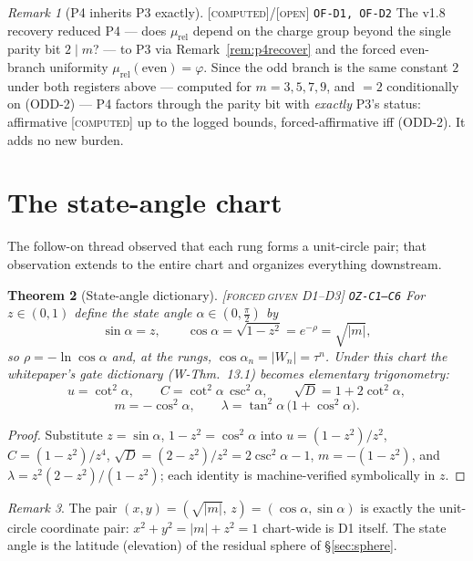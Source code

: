 \documentclass[11pt]{article}
\newcommand{\tagFD}{\textcolor{cF}{\textsc{[forced}}\,\textcolor{cD}{\textsc{given D1--D3]}}}
\newcommand{\tagC}{\textcolor{cC}{\textsc{[computed]}}}
\newcommand{\tagO}{\textcolor{cO}{\textsc{[open]}}}
\newcommand{\hx}[1]{\textcolor{cC}{\footnotesize\texttt{#1}}}
\newcommand{\gp}{\varphi}
\theoremstyle{plain}
\newtheorem{theorem}{Theorem}[section]
\theoremstyle{definition}
\theoremstyle{remark}
\newtheorem{remark}[theorem]{Remark}
\begin{document}
\begin{remark}[P4 inherits P3 exactly]\label{rem:p4transfer}\tagC{}/\tagO{} \hx{OF-D1, OF-D2}
The v1.8 recovery reduced P4 --- does $\mu_{\mathrm{rel}}$ depend on the charge
group beyond the single parity bit $2\mid m$? --- to P3 via
Remark~\ref{rem:p4recover} and the forced even-branch uniformity
$\mu_{\mathrm{rel}}(\text{even})=\gp$. Since the odd branch is the same constant
$2$ under both registers above --- computed for $m=3,5,7,9$, and $=2$
conditionally on (ODD-2) --- P4 factors through the parity bit with \emph{exactly}
P3's status: affirmative \tagC{} up to the logged bounds, forced-affirmative iff
(ODD-2). It adds no new burden.
\end{remark}

\section{The state-angle chart}\label{sec:stateangle}

The follow-on thread observed that each rung forms a unit-circle pair; that
observation extends to the entire chart and organizes everything downstream.

\begin{theorem}[State-angle dictionary]\label{thm:stateangle}\tagFD{} \hx{OZ-C1--C6}
For $z\in(0,1)$ define the \emph{state angle} $\alpha\in(0,\tfrac\pi2)$ by
\[
\sin\alpha=z,\qquad \cos\alpha=\sqrt{1-z^2}=e^{-\rho}=\sqrt{|m|},
\]
so $\rho=-\ln\cos\alpha$ and, at the rungs, $\cos\alpha_n=|W_n|=\tau^n$.
Under this chart the whitepaper's gate dictionary (W-Thm.\ 13.1) becomes
elementary trigonometry:
\[
u=\cot^2\alpha,\qquad
C=\cot^2\alpha\,\csc^2\alpha,\qquad
\sqrt D=1+2\cot^2\alpha,
\]
\[
m=-\cos^2\alpha,\qquad
\lambda=\tan^2\alpha\,\bigl(1+\cos^2\alpha\bigr).
\]
\end{theorem}

\begin{proof}
Substitute $z=\sin\alpha$, $1-z^2=\cos^2\alpha$ into $u=(1-z^2)/z^2$,
$C=(1-z^2)/z^4$, $\sqrt D=(2-z^2)/z^2=2\csc^2\alpha-1$,
$m=-(1-z^2)$, and $\lambda=z^2(2-z^2)/(1-z^2)$; each identity is
machine-verified symbolically in $z$.
\end{proof}

\begin{remark}
The pair $(x,y)=(\sqrt{|m|},\,z)=(\cos\alpha,\sin\alpha)$ is exactly the
unit-circle coordinate pair: $x^2+y^2=|m|+z^2=1$ chart-wide is D1 itself.
The state angle is the latitude (elevation) of the residual sphere of
\S\ref{sec:sphere}.
\end{remark}
\end{document}
